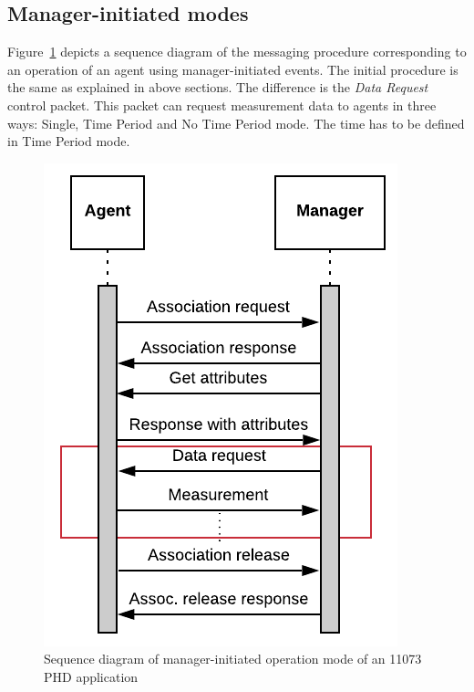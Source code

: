 \subsection{Manager-initiated modes}

Figure~\ref{fig:managerinitiated} depicts a sequence diagram of the messaging procedure corresponding to an operation of an agent using manager-initiated events. The initial procedure is the same as explained in above sections. The difference is the \textit{Data Request} control packet. This packet can request measurement data to agents in three ways: Single, Time Period and No Time Period mode. The time has to be defined in Time Period mode.

\begin{figure}[htbp]
\centerline{\includegraphics[scale=0.35]{figures/Manager-initiatedmode.png}}
\caption{Sequence diagram of manager-initiated operation mode of an 11073 PHD application}
\label{fig:managerinitiated}
\end{figure}
